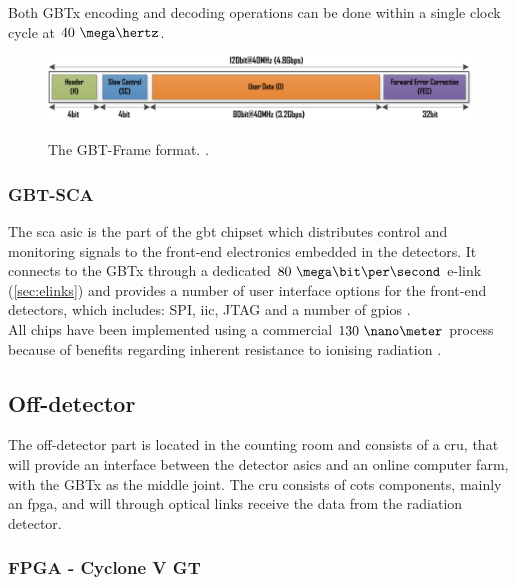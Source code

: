 \documentclass[main.tex]{subfiles}
\begin{document}
Both GBTx encoding and decoding operations can be done within a single clock cycle at $40~\mega\hertz$. 
 
\begin{figure} %
\includegraphics[width=\linewidth]{../img/gbtframe}  \\[0.1 cm]
\caption{The GBT-Frame format. \cite[Figure 4]{gbt_fpga}.}
\label{fig:gbtframe}
\end{figure}

\subsubsection{GBT-SCA}

The \gls{sca} \gls{asic} is the part of the \gls{gbt} chipset which distributes control and monitoring signals to the front-end electronics embedded in the detectors. It connects to the GBTx through a dedicated $80~\mega\bit\per\second$ e-link (\ref{sec:elinks}) and provides a number of user interface options for the front-end detectors, which includes: SPI, \acrshort{iic}, JTAG and a number of \acrshort{gpio}s \cite{gbtsca15}. \\

\noindent
All chips have been implemented using a commercial $130~\nano\meter$ process because of benefits regarding inherent resistance to ionising radiation \cite{gbtpro10}.

\subsection{Off-detector} \label{sec:offdetect}
The off-detector part is located in the counting room and consists of a \gls{cru}, that will provide an interface between the detector \acrshort{asic}s and an online computer farm, with the GBTx as the middle joint. The \gls{cru} consists of \gls{cots} components, mainly an \gls{fpga}, and will through optical links receive the data from the radiation detector.

\subsubsection{FPGA - Cyclone V GT} \label{sec:cyclone}
\end{document}
